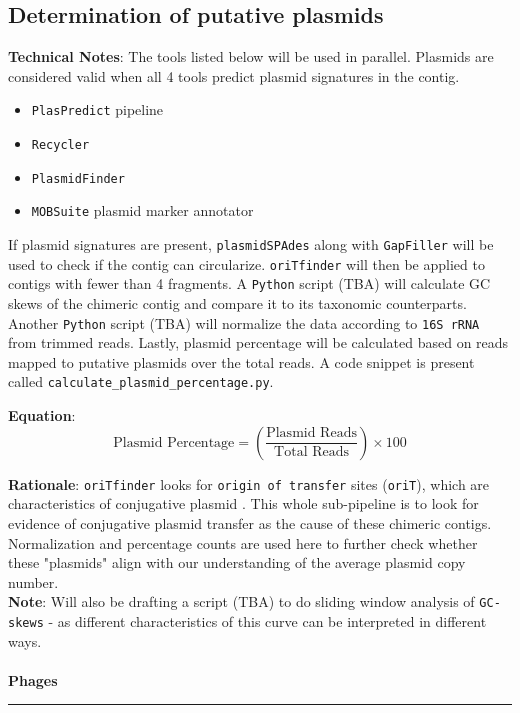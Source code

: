 \documentclass[11pt]{report}
\begin{document}
\subsection{Determination of putative plasmids}
\textbf{Technical Notes}: The tools listed below will be used in parallel. Plasmids are considered valid when all 4 tools predict plasmid signatures in the contig.
\begin{itemize}
	\item \texttt{PlasPredict} pipeline
	\item \texttt{Recycler}
	\item \texttt{PlasmidFinder}
	\item \texttt{MOBSuite} plasmid marker annotator
\end{itemize}
If plasmid signatures are present, \texttt{plasmidSPAdes} along with \texttt{GapFiller} will be used to check if the contig can circularize. \texttt{oriTfinder} will then be applied to contigs with fewer than 4 fragments. A \texttt{Python} script (TBA) will calculate GC skews of the chimeric contig and compare it to its taxonomic counterparts. Another \texttt{Python} script (TBA) will normalize the data according to \texttt{16S rRNA} from trimmed reads. Lastly, plasmid percentage will be calculated based on reads mapped to putative plasmids over the total reads. A code snippet is present called \texttt{calculate\_plasmid\_percentage.py}.

\textbf{Equation}:
\[
\text{Plasmid Percentage} = \left( \frac{\text{Plasmid Reads}}{\text{Total Reads}} \right) \times 100
\]

\textbf{Rationale}: \texttt{oriTfinder} looks for \texttt{origin of transfer} sites (\texttt{oriT}), which are characteristics of conjugative plasmid . This whole sub-pipeline is to look for evidence of conjugative plasmid transfer as the cause of these chimeric contigs. Normalization and percentage counts are used here to further check whether these "plasmids" align with our understanding of the average plasmid copy number. \\
\textbf{Note}: Will also be drafting a script (TBA) to do sliding window analysis of \texttt{GC-skews} - as different characteristics of this curve can be interpreted in different ways. \\
\\ 
\textbf{Phages} \\
\rule{\linewidth}{0.5mm}	
	
\end{document}
